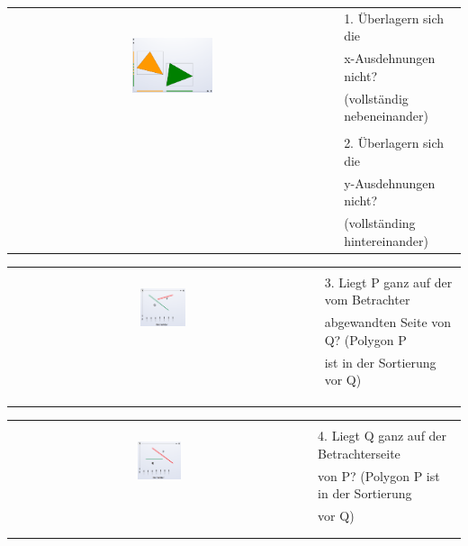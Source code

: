 \begin{tabular}{cl}
  \multirow{3}{*}{
    \includegraphics[width=0.25\textwidth]{assets/paintersalg-overlapping.png}
  } & 1. Überlagern sich die \\
  & x-Ausdehnungen nicht? \\
  & (vollständig nebeneinander) \\
  & \\
  & 2. Überlagern sich die \\
  & y-Ausdehnungen nicht? \\
  & (vollständing hintereinander)\\
\end{tabular}

\begin{tabular}{cl}
  \multirow{3}{*}{
    \includegraphics[width=0.15\textwidth]{assets/paintersalg-backside.png}
  } & \\
  & 3. Liegt P ganz auf der vom Betrachter \\
  & abgewandten Seite von Q? (Polygon P \\
  & ist in der Sortierung vor Q)\\
  & \\
  & \\
  & \\
\end{tabular}

\begin{tabular}{cl}
  \multirow{3}{*}{
    \includegraphics[width=0.15\textwidth]{assets/paintersalg-frontside.png}
  } & \\
  & 4. Liegt Q ganz auf der Betrachterseite  \\
  & von P? (Polygon P ist in der Sortierung \\
  & vor Q) \\
  & \\
  & \\
\end{tabular}

